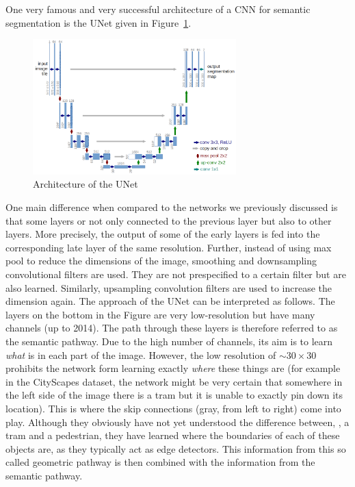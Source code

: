 One very famous and very successful architecture of a CNN for semantic
segmentation is the UNet given in Figure~\ref{fig:unet}.
\begin{figure}[htpb]
  \centering \includegraphics[width=0.7\textwidth]{Figures/unet}%
  \caption{Architecture of the UNet}%
  \label{fig:unet}
\end{figure}
One main difference when compared to the networks we previously discussed is
that some layers or not only connected to the previous layer but also to other
layers. More precisely, the output of some of the early layers is fed into the
corresponding late layer of the same resolution. Further, instead of using max
pool to reduce the dimensions of the image, smoothing and downsampling
convolutional filters are used. They are not prespecified to a certain filter
but are also learned. Similarly, upsampling convolution filters are used to
increase the dimension again. The approach of the UNet can be interpreted as
follows. The layers on the bottom in the Figure are very low-resolution but have
many channels (up to 2014). The path through these layers is therefore referred
to as the semantic pathway. Due to the high number of channels, its aim is to
learn \emph{what} is in each part of the image. However, the low resolution of
$\sim 30 \times 30$ prohibits the network form learning exactly \emph{where}
these things are (for example in the CityScapes dataset, the network might be
very certain that somewhere in the left side of the image there is a tram but it
is unable to exactly pin down its location). This is where the skip connections
(gray, from left to right) come into play. Although they obviously have not yet
understood the difference between, \eg, a tram and a pedestrian, they have
learned where the boundaries of each of these objects are, as they typically act
as edge detectors. This information from this so called geometric pathway is
then combined with the information from the semantic pathway.

